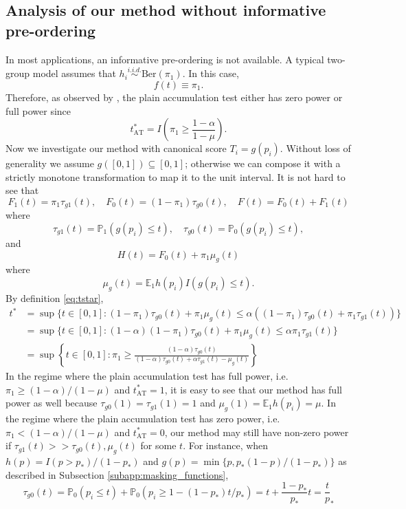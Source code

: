 \documentclass{biometrika}
\newcommand{\pth}{p_{*}}
\newcommand{\lb}{\left(}
\newcommand{\rb}{\right)}
\newcommand{\E}{\mathbb{E}}
\renewcommand{\P}{\mathbb{P}}
\newcommand{\1}{\mathbf{1}}
\begin{document}
\subsection{Analysis of our method without informative pre-ordering}
In most applications, an informative pre-ordering is not available. A typical two-group model assumes that $h_{i}\stackrel{i.i.d.}{\sim}\mathrm{Ber}(\pi_{1})$. In this case,
\[f(t)\equiv \pi_{1}.\]
Therefore, as observed by \cite{lei2016power}, the plain accumulation test either has zero power or full power since
\[t_{\mathrm{AT}}^{*} = I\lb\pi_{1}\ge \frac{1 - \alpha}{1 - \mu}\rb.\]
Now we investigate our method with canonical score $T_{i} = g(p_{i})$. Without loss of generality we assume $g([0,1]) \subseteq [0,1]$; otherwise we can compose it with a strictly monotone transformation to map it to the unit interval. It is not hard to see that 
\[F_{1}(t) = \pi_{1}\tau_{g1}(t), \quad F_{0}(t) = (1 - \pi_{1})\tau_{g0}(t), \quad F(t) = F_{0}(t) + F_{1}(t)\]
where
\[\tau_{g1}(t) = \P_{1}(g(p_{i})\le t), \quad \tau_{g0}(t) = \P_{0}(g(p_{i})\le t),\]
and 
\[H(t) = F_{0}(t) + \pi_{1}\mu_{g}(t)\]
where
\[\mu_{g}(t) = \E_{1}h(p_{i})I(g(p_{i})\le t).\]
By definition \eqref{eq:tstar},
\begin{align*}
  t^{*} &= \sup\{t\in [0, 1]: (1 - \pi_{1})\tau_{g0}(t) + \pi_{1}\mu_{g}(t)\le \alpha ((1 - \pi_{1})\tau_{g0}(t) + \pi_{1}\tau_{g1}(t))\}\\
& = \sup\{t\in [0, 1]: (1 - \alpha)(1 - \pi_{1})\tau_{g0}(t)+ \pi_{1}\mu_{g}(t) \le \alpha\pi_{1}\tau_{g1}(t)\}\\
& = \sup\left\{t\in [0, 1]: \pi_{1}\ge \frac{(1 - \alpha)\tau_{g0}(t)}{(1 - \alpha)\tau_{g0}(t) + \alpha\tau_{g1}(t) - \mu_{g}(t)}\right\}
\end{align*}
In the regime where the plain accumulation test has full power, i.e. $\pi_{1}\ge (1 - \alpha) / (1 - \mu)$ and $t_{\mathrm{AT}}^{*} = 1$, it is easy to see that our method has full power as well because $\tau_{g0}(1) = \tau_{g1}(1) = 1$ and $\mu_{g}(1) = \E_{1}h(p_{i}) = \mu$. In the regime where the plain accumulation test has zero power, i.e. $\pi_{1} < (1 - \alpha) / (1 - \mu)$ and $t_{\mathrm{AT}}^{*} = 0$, our method may still have non-zero power if $\tau_{g1}(t) >\!\!> \tau_{g0}(t), \mu_{g}(t)$ for some $t$. For instance, when $h(p) = I(p > \pth) / (1 - \pth)$ and $g(p) = \min\{p, \pth (1 - p) / (1 - \pth)\}$ as described in Subsection \ref{subapp:masking_functions}, 
\[\tau_{g0}(t) = \P_{0}(p_{i}\le t) + \P_{0}(p_{i}\ge 1 - (1 - \pth) t / \pth ) = t + \frac{1 - \pth}{\pth}t = \frac{t}\pth\]
\end{document}
